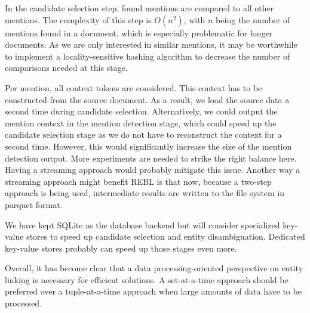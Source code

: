In the candidate selection step, found mentions are compared to all other mentions. The complexity of this step is $O(n^2)$, with $n$ being the number of mentions found in a document, which is especially problematic for longer documents. As we are only interested in similar mentions, it may be worthwhile to implement a locality-sensitive hashing algorithm to decrease the number of comparisons needed at this stage. 

Per mention, all context tokens are considered. This context has to be constructed from the source document. As a result, we load the source data a second time during candidate selection. Alternatively, we could output the mention context in the mention detection stage, which could speed up the candidate selection stage as we do not have to reconstruct the context for a second time. However, this would significantly increase the size of the mention detection output. More experiments are needed to strike the right balance here. 
Having a streaming approach would probably mitigate this issue. Another way a streaming approach might benefit REBL is that now, because a two-step approach is being used, intermediate results are written to the file system in parquet format. 

We have kept SQLite as the database backend but will consider specialized key-value stores to speed up candidate selection and entity disambiguation. Dedicated key-value stores probably can speed up those stages even more. 

Overall, it has become clear that a data processing-oriented perspective on entity linking is necessary for efficient solutions. A set-at-a-time approach should be preferred over a tuple-at-a-time approach when large amounts of data have to be processed. 